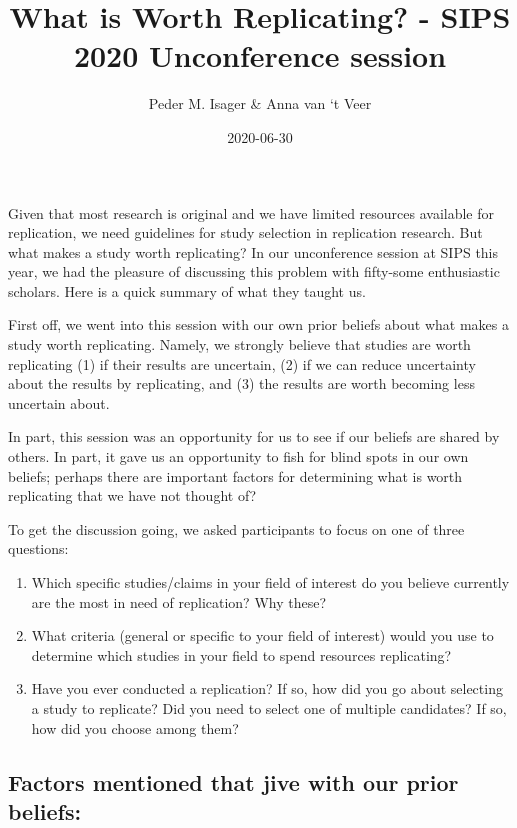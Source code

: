 \documentclass[
]{article}
\title{What is Worth Replicating? - SIPS 2020 Unconference session}
\author{Peder M. Isager \& Anna van `t Veer}
\date{2020-06-30}
\providecommand{\tightlist}{%
  \setlength{\itemsep}{0pt}\setlength{\parskip}{0pt}}
\begin{document}
\maketitle

Given that most research is original and we have limited resources
available for replication, we need guidelines for study selection in
replication research. But what makes a study worth replicating? In our
unconference session at SIPS this year, we had the pleasure of
discussing this problem with fifty-some enthusiastic scholars. Here is a
quick summary of what they taught us.

First off, we went into this session with our own prior beliefs about
what makes a study worth replicating. Namely, we strongly believe that
studies are worth replicating (1) if their results are uncertain, (2) if
we can reduce uncertainty about the results by replicating, and (3) the
results are worth becoming less uncertain about.

In part, this session was an opportunity for us to see if our beliefs
are shared by others. In part, it gave us an opportunity to fish for
blind spots in our own beliefs; perhaps there are important factors for
determining what is worth replicating that we have not thought of?

To get the discussion going, we asked participants to focus on one of
three questions:

\begin{enumerate}
\def\labelenumi{\arabic{enumi})}
\tightlist
\item
  Which specific studies/claims in your field of interest do you believe
  currently are the most in need of replication? Why these?
\item
  What criteria (general or specific to your field of interest) would
  you use to determine which studies in your field to spend resources
  replicating?
\item
  Have you ever conducted a replication? If so, how did you go about
  selecting a study to replicate? Did you need to select one of multiple
  candidates? If so, how did you choose among them?
\end{enumerate}

\hypertarget{factors-mentioned-that-jive-with-our-prior-beliefs}{%
\subsection{Factors mentioned that jive with our prior
beliefs:}\label{factors-mentioned-that-jive-with-our-prior-beliefs}}
\end{document}
